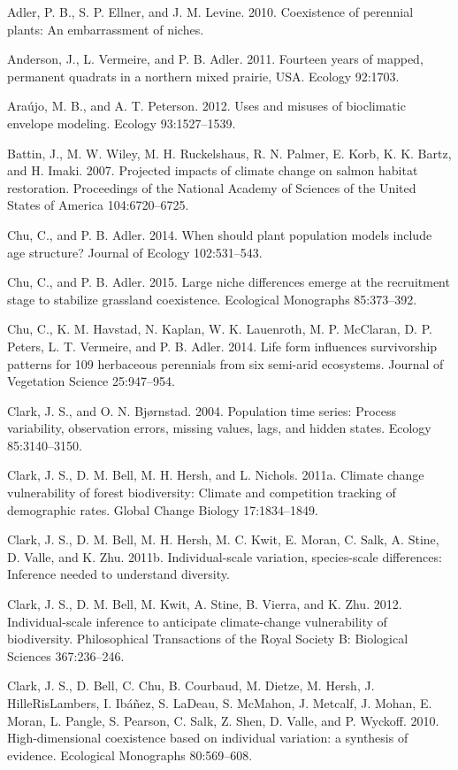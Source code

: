 \documentclass[12pt,]{article}
\begin{document}
Adler, P. B., S. P. Ellner, and J. M. Levine. 2010. Coexistence of
perennial plants: An embarrassment of niches.

Anderson, J., L. Vermeire, and P. B. Adler. 2011. Fourteen years of
mapped, permanent quadrats in a northern mixed prairie, USA. Ecology
92:1703.

Ara{ú}jo, M. B., and A. T. Peterson. 2012. Uses and misuses of
bioclimatic envelope modeling. Ecology 93:1527--1539.

Battin, J., M. W. Wiley, M. H. Ruckelshaus, R. N. Palmer, E. Korb, K. K.
Bartz, and H. Imaki. 2007. Projected impacts of climate change on salmon
habitat restoration. Proceedings of the National Academy of Sciences of
the United States of America 104:6720--6725.

Chu, C., and P. B. Adler. 2014. When should plant population models
include age structure? Journal of Ecology 102:531--543.

Chu, C., and P. B. Adler. 2015. Large niche differences emerge at the
recruitment stage to stabilize grassland coexistence. Ecological
Monographs 85:373--392.

Chu, C., K. M. Havstad, N. Kaplan, W. K. Lauenroth, M. P. McClaran, D.
P. Peters, L. T. Vermeire, and P. B. Adler. 2014. Life form influences
survivorship patterns for 109 herbaceous perennials from six semi-arid
ecosystems. Journal of Vegetation Science 25:947--954.

Clark, J. S., and O. N. Bj{ø}rnstad. 2004. Population time series:
Process variability, observation errors, missing values, lags, and
hidden states. Ecology 85:3140--3150.

Clark, J. S., D. M. Bell, M. H. Hersh, and L. Nichols. 2011a. Climate
change vulnerability of forest biodiversity: Climate and competition
tracking of demographic rates. Global Change Biology 17:1834--1849.

Clark, J. S., D. M. Bell, M. H. Hersh, M. C. Kwit, E. Moran, C. Salk, A.
Stine, D. Valle, and K. Zhu. 2011b. Individual-scale variation,
species-scale differences: Inference needed to understand diversity.

Clark, J. S., D. M. Bell, M. Kwit, A. Stine, B. Vierra, and K. Zhu.
2012. Individual-scale inference to anticipate climate-change
vulnerability of biodiversity. Philosophical Transactions of the Royal
Society B: Biological Sciences 367:236--246.

Clark, J. S., D. Bell, C. Chu, B. Courbaud, M. Dietze, M. Hersh, J.
HilleRisLambers, I. Ib{á}{ñ}ez, S. LaDeau, S. McMahon, J. Metcalf, J.
Mohan, E. Moran, L. Pangle, S. Pearson, C. Salk, Z. Shen, D. Valle, and
P. Wyckoff. 2010. High-dimensional coexistence based on individual
variation: a synthesis of evidence. Ecological Monographs 80:569--608.
\end{document}
